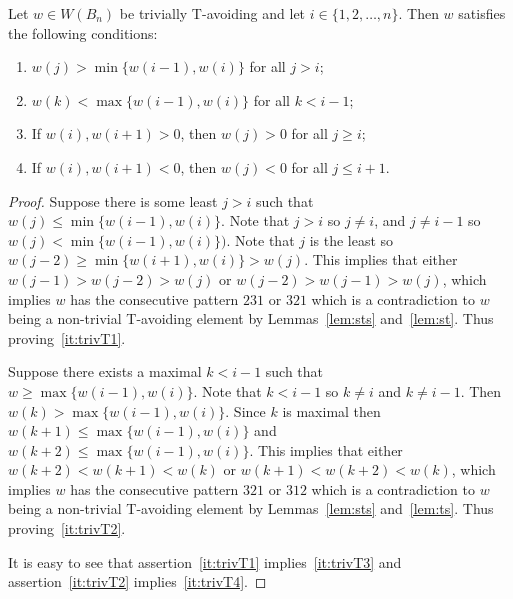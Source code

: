 \begin{lemma}\label{lem:prodofCommB}
Let $w \in W(B_n)$ be trivially T-avoiding and let $i \in \{1,2, \ldots, n\}$. Then $w$ satisfies the following conditions:
\begin{enumerate}[leftmargin=2cm]
\item $w(j) > \min\{w(i-1), w(i)\}$ for all $j >i$;\label{it:trivT1}
\item $w(k) < \max\{w(i-1), w(i)\}$ for all $k < i-1$;\label{it:trivT2}
\item If $w(i), w(i+1) > 0$, then $w(j)>0$ for all $j \geq i$;\label{it:trivT3}
\item If $w(i), w(i+1) < 0$, then $w(j)<0$ for all $j \leq i+1$.\label{it:trivT4}
\end{enumerate}
\begin{proof}
	Suppose there is some least $j>i$ such that $w(j) \leq \min\{w(i-1), w(i)\}$. Note that $j>i$ so $j \neq i$, and $j \neq i-1$ so $w(j) < \min\{w(i-1), w(i)\})$. Note that $j$ is the least so $w(j-2) \geq \min\{w(i+1), w(i)\}>w(j)$. This implies that either $w(j-1)>w(j-2)>w(j)$ or $w(j-2)>w(j-1)>w(j)$, which implies $w$ has the consecutive pattern $231$ or $321$ which is a contradiction to $w$ being a non-trivial T-avoiding element by Lemmas~\ref{lem:sts} and~\ref{lem:st}. Thus proving~\ref{it:trivT1}.
	
	Suppose there exists a maximal $k<i-1$ such that $w \geq \max\{w(i-1), w(i)\}$. Note that $k < i-1$ so $k \neq i$ and $k \neq i-1$. Then $w(k)> \max\{w(i-1), w(i)\}$. Since $k$ is maximal then $w(k+1) \leq  \max\{w(i-1), w(i)\}$ and $w(k+2) \leq \max\{w(i-1), w(i)\}$. This implies that either $w(k+2)<w(k+1)<w(k)$ or $w(k+1)<w(k+2)<w(k)$, which implies $w$ has the consecutive pattern $321$ or $312$ which is a contradiction to $w$ being a non-trivial T-avoiding element by Lemmas~\ref{lem:sts} and~\ref{lem:ts}. Thus proving~\ref{it:trivT2}.
	
	It is easy to see that assertion~\ref{it:trivT1} implies~\ref{it:trivT3} and assertion~\ref{it:trivT2} implies~\ref{it:trivT4}.
\end{proof}	
\end{lemma}


